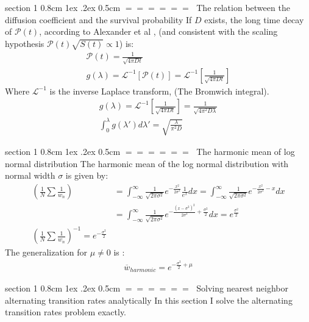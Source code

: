 \documentclass[onecolumn,fleqn,notitlepage,secnumarabic]{revtex4}
\makeatletter
\def\section{%
  \@startsection
    {section}%
    {1}%
    {\z@}%
    {0.8cm \@plus1ex \@minus .2ex}%
    {0.5cm}%
    {\Large\bf $=\!=\!=\!=\!=\!=\;$}%
}%
\makeatother
\begin{document}
\section{The relation between the diffusion coefficient and the survival probability}
If $D$ exists, the long time decay of $\mathcal{P}(t)$, according to Alexander et al \cite{Alexander:1981:RMP}, (and consistent with the scaling hypothesis $\mathcal{P}(t)\sqrt{S(t)} \propto 1$) is:
\begin{align}
    \mathcal{P}(t) = \frac{1}{\sqrt{4\pi D t}} \\
    g(\lambda) = \mathcal{L}^{-1}[\mathcal{P}(t)] = \mathcal{L}^{-1}\left[\frac{1}{\sqrt{4\pi D t}}\right]
\end{align}
Where $\mathcal{L}^{-1}$ is the inverse Laplace transform, (The Bromwich integral).
\begin{align}
    g(\lambda) = \mathcal{L}^{-1}\left[\frac{1}{\sqrt{4\pi Dt}}\right] = \frac{1}{\sqrt{4\pi^2 D\lambda}} \\
    \int_0^\lambda g(\lambda')d\lambda' = \sqrt{\frac{\lambda}{\pi^2 D}}
\end{align}

\section{The harmonic mean of log normal distribution}
The harmonic mean of the log normal distribution with normal width $\sigma$ is given by:
\begin{align}
\left(\frac{1}{N}\sum\frac{1}{w_n}\right)&= \int_{-\infty}^\infty \frac{1}{\sqrt{2\pi\sigma^2}}e^{-\frac{x^2}{2\sigma^2}} \frac{1}{e^x} dx  = \int_{-\infty}^\infty \frac{1}{\sqrt{2\pi\sigma^2}}e^{-\frac{x^2}{2\sigma^2}-x} dx \\
&= \int_{-\infty}^\infty \frac{1}{\sqrt{2\pi\sigma^2}}e^{-\frac{\left(x-\sigma^2\right)^2}{2\sigma^2}+\frac{\sigma^2}{2}} dx = e^{\frac{\sigma^2}{2}}\\
\left(\frac{1}{N}\sum\frac{1}{w_n}\right)^{-1} = e^{-\frac{\sigma^2}{2}}
\end{align}
The generalization for $\mu\neq 0$ is :
\begin{align}
\overline{w}_{harmonic} = e^{-\frac{\sigma^2}{2}+\mu}
\end{align}

\section{Solving nearest neighbor alternating transition rates analytically}
In this section I solve the alternating transition rates problem exactly.
\end{document}
